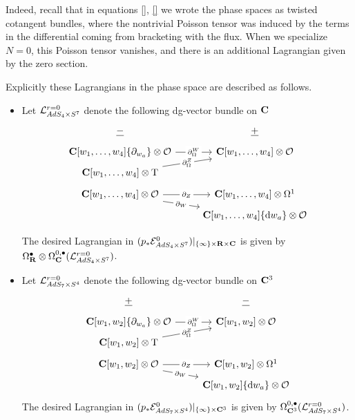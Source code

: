 \documentclass[../main.tex]{subfiles}
\begin{document}
Indeed, recall that in equations \eqref{}, \eqref{} we wrote the phase spaces as twisted cotangent bundles, where the nontrivial Poisson tensor was induced by the terms in the differential coming from bracketing with the flux. When we specialize $N=0$, this Poisson tensor vanishes, and there is an additional Lagrangian given by the zero section. 

Explicitly these Lagrangians in the phase space are described as follows.
\begin{itemize}
\item Let $\mathcal{L}_{AdS_4\times S^7}^{r=0}$ denote the following dg-vector bundle on $\mathbf{C}$ 
 \begin{equation}
 \begin{tikzcd}[row sep = 1 ex]
   \ul{-} & \ul{+} \\
\C[w_1,\ldots, w_4] \{\partial_{w_a}\} \otimes \mc{O}\ar[r, "\del^W_\Omega" description] &\C[w_1,\ldots, w_4]  \otimes \mc O \\
\C[w_1,\ldots, w_4]   \otimes \T\ar[ur, "\del^Z_\Omega" description] \\
\C[w_1,\ldots, w_4] \otimes \mc{O}\ar[r, "\del_Z" description]\ar[dr, "\del_W" description] & \C[w_1,\ldots, w_4]\otimes \Omega^1 \\ & \C[w_1,\ldots, w_4] \{\d w_a\}  \otimes \mc O
\end{tikzcd}
\end{equation}

The desired Lagrangian in $(p_*\mathcal{E}^{0}_{AdS_4\times S^7})|_{\{\infty\} \times\mathbf{R}\times\mathbf{C}}$ is given by $\Omega^\bullet_{\mathbf{R}}\otimes \Omega^{0,\bullet}_{\mathbf{C}} (\mathcal{L}_{AdS_4\times S^7}^{r=0})$.


\item Let $\mathcal{L}_{AdS_7\times S^4}^{r=0}$ denote the following dg-vector bundle on $\mathbf{C}^3$
 \begin{equation}
 \begin{tikzcd}[row sep = 1 ex]
   \ul{+} & \ul{-} \\
\C[w_1, w_2] \{\partial_{w_a}\} \otimes \mc{O}\ar[r, "\del^W_\Omega" description] &\C[w_1,w_2]  \otimes \mc O \\
\C[w_1, w_2]   \otimes \T\ar[ur, "\del^Z_\Omega" description] \\
\C[w_1, w_2] \otimes \mc{O}\ar[r, "\del_Z" description]\ar[dr, "\del_W" description] & \C[w_1,w_2]\otimes \Omega^1 \\ & \C[w_1, w_2] \{\d w_a\}  \otimes \mc O
\end{tikzcd}
\end{equation}
The desired Lagrangian in $(p_*\mathcal{E}^{0}_{AdS_7\times S^4})|_{\{\infty\} \times\mathbf{C}^3}$ is given by $\Omega^{0,\bullet}_{\mathbf{C}^3} (\mathcal{L}_{AdS_7\times S^4}^{r=0})$.
\end{itemize}
\end{document}
